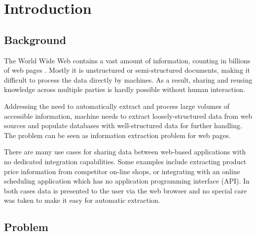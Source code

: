 \chapter{Introduction}
\label{ch:intro}


\section{Background} %
\label{sec:Problem}


The World Wide Web contains a vast amount of information, counting in billions of web pages \cite{signorini2005a}. Mostly it is unstructured or semi-structured documents, making it difficult to process the data directly by machines. As a result, sharing and reusing knowledge across multiple parties is hardly possible without human interaction.

Addressing the need to automatically extract and process large volumes of accessible information, machine needs to extract loosely-structured data from web sources and populate databases with well-structured data for further handling. The problem can be seen as information extraction problem for web pages. 

There are many use cases for sharing data between web-based applications with no dedicated integration capabilities. Some examples include extracting product price information from competitor on-line shops, or integrating with an online scheduling application which has no application programming interface (API). In both cases data is presented to the user via the web browser and no special care was taken to make it easy for automatic extraction.


\section{Problem}

 
